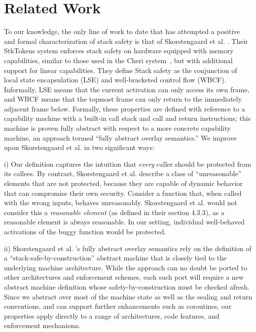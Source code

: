 \documentclass[10pt,conference]{ieeetran}%
\theoremstyle{definition}
\begin{document}
{\section{Related Work}
\label{sec:relwork}

%
To our knowledge, the only line of work to date that has attempted
a positive and formal characterization of stack safety
is that of Skorstengaard et al. \cite{SkorstengaardSTKJFP}. Their
StkTokens system enforces stack safety on hardware equipped with
memory capabilities, similar to those used in the Cheri system~\cite{Woodruff+14,Chisnall+15}, but
with additional support for linear capabilities.
They define Stack safety as the conjunction of local state encapsulation (LSE) and
well-bracketed control flow (WBCF).
Informally, LSE means that the current activation can only access its own frame,
and WBCF means that the topmost frame can only return to
the immediately adjacent frame below. Formally, these properties are defined
with reference to a capability machine with a built-in call stack and call and return
instructions; this machine is proven fully abstract with respect to a more
concrete capability machine, an approach termed ``fully abstract overlay semantics.''
We improve upon Skorstengaard et al. \cite{SkorstengaardSTKJFP} in two significant ways:

i) Our definition captures the intuition that {\em
  every} caller should be protected from its callees.  By contrast,
  Skorstengaard et al. \cite{SkorstengaardSTKJFP} describe a class of ``unreasonable'' elements
  that are not protected, because they are capable of dynamic behavior that can compromise
  their own security. Consider a function that, when called with the wrong
  inputs, behaves unreasonably. Skorstengaard et al. \cite{SkorstengaardSTKJFP} would not consider this a
  {\em reasonable element} (as defined in their section 4.3.3), as a reasonable
  element is always reasonable. In our setting, individual
  well-behaved activations of the buggy function would be protected.

ii) Skorstengaard et al. \cite{SkorstengaardSTKJFP}'s fully
  abstract overlay semantics rely on the definition of a ``stack-safe-by-construction''
  abstract machine that is closely tied to the underlying machine architecture.
  While the approach can no doubt be ported to other architectures and enforcement
  schemes, each such port will require a new abstract machine definition whose
  safety-by-construction must be checked afresh.
  Since we abstract over most of the machine state as well as the sealing and return conventions, and
  can support further enhancements such as coroutines,
  our properties apply directly to a range of architectures, code features, and enforcement mechanisms.

}
\end{document}
